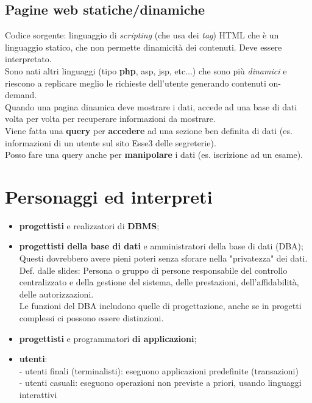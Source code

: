 \subsection{Pagine web statiche/dinamiche}
Codice sorgente: linguaggio di \textit{scripting} (che usa dei \textit{tag}) HTML che è un linguaggio statico, che non permette dinamicità dei contenuti. Deve essere interpretato.
\\Sono nati altri linguaggi (tipo \textbf{php}, asp, jsp, etc...) che sono più \textit{dinamici} e riescono a replicare meglio le richieste dell'utente generando contenuti on-demand.
\\Quando una pagina dinamica deve mostrare i dati, accede ad una base di dati volta per volta per recuperare informazioni da mostrare.
\\Viene fatta una \textbf{query} per \textbf{accedere} ad una sezione ben definita di dati (es. informazioni di un utente sul sito Esse3 delle segreterie).
\\Posso fare una query anche per \textbf{manipolare} i dati (es. iscrizione ad un esame).

\section{Personaggi ed interpreti}
\begin{itemize}
    \item \textbf{progettisti} e realizzatori di \textbf{DBMS};
    \item \textbf{progettisti della base di dati} e amministratori della base di dati (DBA);
    \\Questi dovrebbero avere pieni poteri senza sforare nella "privatezza" dei dati.
    \\Def. dalle slides: Persona o gruppo di persone responsabile del controllo centralizzato e della gestione del sistema, delle prestazioni, dell'affidabilità, delle autorizzazioni. 
    \\Le funzioni del DBA includono quelle di progettazione, anche se in progetti complessi ci possono essere distinzioni.
    \item \textbf{progettisti} e programmatori \textbf{di applicazioni};
    \item \textbf{utenti}:
    \\- utenti finali (terminalisti): eseguono applicazioni predefinite (transazioni)
    \\- utenti casuali: eseguono operazioni non previste a priori, usando linguaggi interattivi
\end{itemize}

